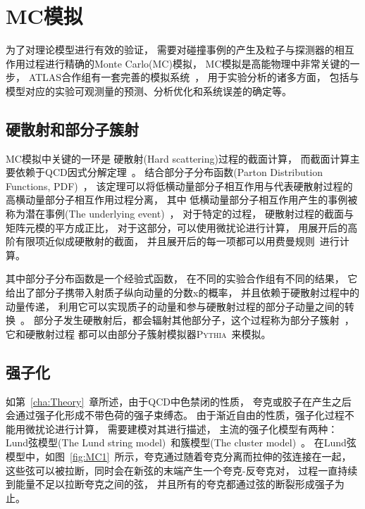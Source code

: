 \section{MC模拟}
\label{sec:Simulation}

为了对理论模型进行有效的验证，
需要对碰撞事例的产生及粒子与探测器的相互作用过程进行精确的Monte Carlo(MC)模拟，
MC模拟是高能物理中非常关键的一步，
ATLAS合作组有一套完善的模拟系统~\cite{ATLASMC}，
用于实验分析的诸多方面，
包括与模型对应的实验可观测量的预测、分析优化和系统误差的确定等。

\subsection{硬散射和部分子簇射}
\label{sec:MCHS}

MC模拟中关键的一环是
硬散射(Hard scattering)过程的截面计算，
而截面计算主要依赖于QCD因式分解定理~\cite{MC1}。
结合部分子分布函数(Parton Distribution Functions, PDF)~\cite{MC2}，
该定理可以将低横动量部分子相互作用与代表硬散射过程的高横动量部分子相互作用过程分离，
其中
低横动量部分子相互作用产生的事例被称为潜在事例(The underlying event)~\cite{MC3}，
对于特定的过程，
硬散射过程的截面与矩阵元模的平方成正比，
对于这部分，可以使用微扰论进行计算，
用展开后的高阶有限项近似成硬散射的截面，
并且展开后的每一项都可以用费曼规则~\cite{FEYNR}进行计算。

其中部分子分布函数是一个经验式函数，
在不同的实验合作组有不同的结果，
它给出了部分子携带入射质子纵向动量的分数x的概率，
并且依赖于硬散射过程中的动量传递，
利用它可以实现质子的动量和参与硬散射过程的部分子动量之间的转换~\cite{MC1}。
部分子发生硬散射后，都会辐射其他部分子，这个过程称为部分子簇射~\cite{MC6}，
它和硬散射过程
都可以由部分子簇射模拟器\textsc{Pythia}~\cite{MC5}来模拟。


\subsection{强子化}
\label{sec:MCHARD}

如第~\ref{cha:Theory}~章所述，由于QCD中色禁闭的性质，
夸克或胶子在产生之后会通过强子化形成不带色荷的强子束缚态。
由于渐近自由的性质，强子化过程不能用微扰论进行计算，
需要建模对其进行描述，
主流的强子化模型有两种：
Lund弦模型(The Lund string model)~\cite{Hadonization}和簇模型(The cluster model)~\cite{MC4}。
在Lund弦模型中，如图~\ref{fig:MC1}~所示，夸克通过随着夸克分离而拉伸的弦连接在一起，
这些弦可以被拉断，同时会在新弦的末端产生一个夸克-反夸克对，
过程一直持续到能量不足以拉断夸克之间的弦，
并且所有的夸克都通过弦的断裂形成强子为止。

